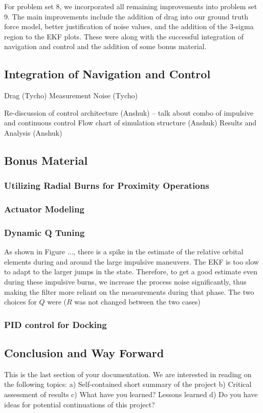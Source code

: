 For problem set 8, we incorporated all remaining improvements into problem set 9. The main improvements include the addition of drag into our ground truth force model, better justification of noise values, and the addition of the 3-sigma region to the EKF plots. These were along with the successful integration of navigation and control and the addition of some bonus material. 

\subsection{Integration of Navigation and Control}
Drag (Tycho)
Measurement Noise (Tycho)

Re-discussion of control architecture (Anshuk) -- talk about combo of impulsive and continuous control
Flow chart of simulation structure (Anshuk)
Results and Analysis (Anshuk)



\subsection{Bonus Material}
\subsubsection{Utilizing Radial Burns for Proximity Operations}

\subsubsection{Actuator Modeling}

\subsubsection{Dynamic Q Tuning}
As shown in Figure ..., there is a spike in the estimate of the relative orbital elements during and around the large impulsive maneuvers. The EKF is too slow to adapt to the larger jumps in the state. Therefore, to get a good estimate even during these impulsive burns, we increase the process noise significantly, thus making the filter more reliant on the measurements during that phase. The two choices for $Q$ were ($R$ was not changed between the two cases)

\subsubsection{PID control for Docking}


\subsection{Conclusion and Way Forward}
This is the last section of your documentation. We are interested in reading on the
following topics:
a) Self-contained short summary of the project
b) Critical assessment of results
c) What have you learned? Lessons learned
d) Do you have ideas for potential continuations of this project?